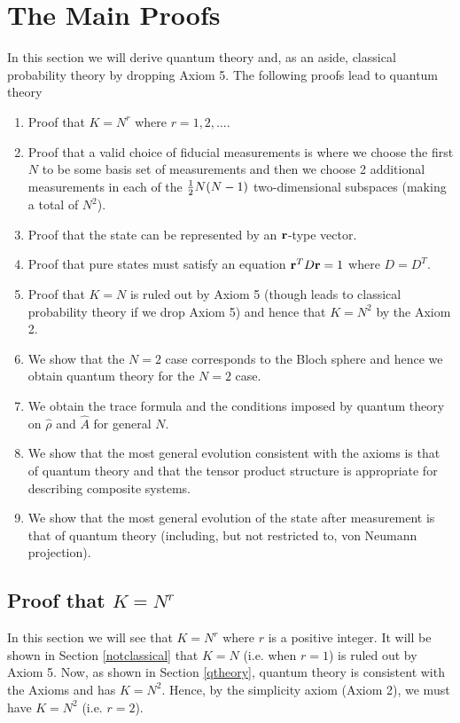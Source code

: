 \documentclass[12pt]{article}
\begin{document}
\section{The Main Proofs}

In this section we will derive quantum theory and, as an aside,
classical probability theory by dropping Axiom 5.
The following proofs lead to quantum theory

\begin{enumerate}
\item Proof that $K=N^r$ where $r=1,2,\dots$.
\item Proof that a valid choice of fiducial measurements is where we
choose the first $N$ to be some basis set of measurements and then we
choose 2 additional measurements in each of
the ${1\over2}N(N-1)$ two-dimensional subspaces (making a total of
$N^2$).
\item Proof that the state can be represented by an ${\bf r}$-type
vector.
\item Proof that pure states must satisfy an equation ${\bf r}^T D{\bf
r}=1$ where $D=D^T$.
\item Proof that $K=N$ is ruled out by Axiom 5 (though
leads to classical probability theory if we drop Axiom 5) and hence that
$K=N^2$ by the Axiom 2.
\item We show that the $N=2$ case corresponds to the Bloch sphere and
hence we obtain quantum theory for the $N=2$ case.
\item We obtain the trace formula and the conditions imposed by quantum
theory on $\hat{\rho}$ and $\hat{A}$ for general $N$.
\item We show that the most general evolution consistent with the axioms
is that of quantum theory and that the tensor product structure is
appropriate for describing composite systems.
\item We show that the most general evolution of the state after
measurement is that of quantum theory (including, but not restricted to,
von Neumann projection).
\end{enumerate}

\subsection{Proof that $K=N^r$}\label{secKNr}

In this section we will see that $K=N^r$ where $r$ is a positive
integer.  It will be shown in Section \ref{notclassical} that $K=N$
(i.e. when $r=1$) is ruled out by Axiom 5. Now, as shown in Section
\ref{qtheory}, quantum theory is consistent with the Axioms and has
$K=N^2$.  Hence, by the simplicity axiom (Axiom 2), we must have $K=N^2$
(i.e. $r=2$).
\end{document}
